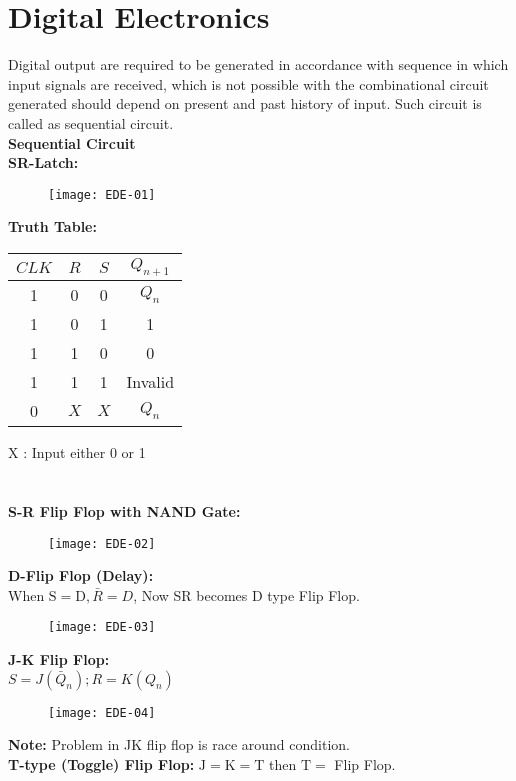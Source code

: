 \chapter{Digital Electronics}
Digital output are required to be generated in accordance with sequence in which input signals are received, which is not possible with the combinational circuit generated should depend on present and past history of input. Such circuit is called as sequential circuit.\\
\textbf{Sequential Circuit}\\
\textbf{SR-Latch:}
\begin{figure}[H]
	\centering
	\texttt{[image: EDE-01]}
\end{figure}
\textbf{Truth Table:}
\begin{tabular}{|c|c|c|c|}
	\hline$C L K$ & $R$ & $S$ & $Q_{n+1}$ \\
	\hline 1 & 0 & 0 & $Q_{n}$ \\
	\hline 1 & 0 & 1 & 1 \\
	\hline 1 & 1 & 0 & 0 \\
	\hline 1 & 1 & 1 & Invalid \\
	\hline 0 & $X$ & $X$ & $Q_{n}$ \\
	\hline
\end{tabular}
$\mathrm{X}$ : Input either 0 or 1\\\\\\
\textbf { S-R Flip Flop with NAND Gate: }\\
\begin{figure}[H]
	\centering
	\texttt{[image: EDE-02]}
\end{figure}
\textbf {D-Flip Flop (Delay): }\\
When $\mathrm{S}=\mathrm{D}, \bar{R}=D$, Now SR becomes $\mathrm{D}$ type Flip Flop.
\begin{figure}[H]
	\centering
	\texttt{[image: EDE-03]}
\end{figure}
\textbf { J-K Flip Flop: }\\
$S=J\left(\bar{Q}_{n}\right) ; R=K\left(Q_{n}\right)$
\begin{figure}[H]
	\centering
	\texttt{[image: EDE-04]}
\end{figure}
\textbf{Note:} Problem in JK flip flop is race around condition.\\
 \textbf{T-type (Toggle) Flip Flop:} $\mathrm{J}=\mathrm{K}=\mathrm{T}$ then $\mathrm{T}=$ Flip Flop.
